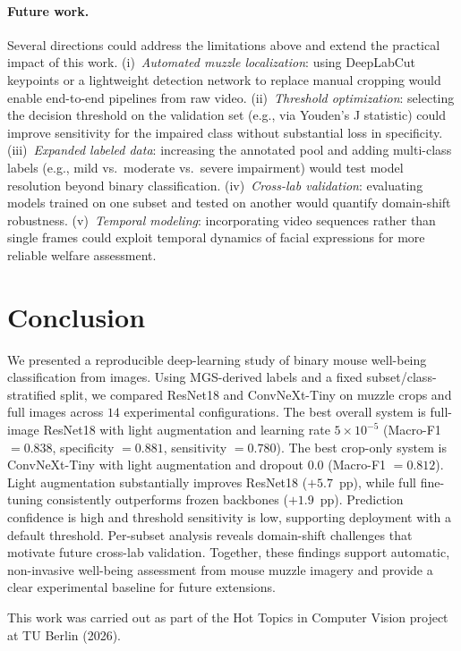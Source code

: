 \documentclass[sigconf]{acmart}
\begin{document}
\paragraph{Future work.}
Several directions could address the limitations above and extend the
practical impact of this work. (i)~\emph{Automated muzzle localization}: using
DeepLabCut keypoints or a lightweight detection network to replace manual
cropping would enable end-to-end pipelines from raw video. (ii)~\emph{Threshold
optimization}: selecting the decision threshold on the validation set (e.g.,
via Youden's J statistic) could improve sensitivity for the impaired class
without substantial loss in specificity. (iii)~\emph{Expanded labeled data}:
increasing the annotated pool and adding multi-class labels (e.g., mild vs.\
moderate vs.\ severe impairment) would test model resolution beyond binary
classification. (iv)~\emph{Cross-lab validation}: evaluating models trained on
one subset and tested on another would quantify domain-shift robustness.
(v)~\emph{Temporal modeling}: incorporating video sequences rather than single
frames could exploit temporal dynamics of facial expressions for more reliable
welfare assessment.

\section{Conclusion}
\label{sec:conclusion}

We presented a reproducible deep-learning study of binary mouse well-being
classification from images. Using MGS-derived labels and a fixed
subset/class-stratified split, we compared ResNet18 and ConvNeXt-Tiny on muzzle
crops and full images across $14$ experimental configurations. The best overall
system is full-image ResNet18 with light augmentation and learning rate
$5\times10^{-5}$ (Macro-F1 $=0.838$, specificity $=0.881$, sensitivity
$=0.780$). The best crop-only system is ConvNeXt-Tiny with light augmentation
and dropout $0.0$ (Macro-F1 $=0.812$). Light augmentation substantially
improves ResNet18 ($+5.7$~pp), while full fine-tuning consistently outperforms
frozen backbones ($+1.9$~pp). Prediction confidence is high and threshold
sensitivity is low, supporting deployment with a default threshold. Per-subset
analysis reveals domain-shift challenges that motivate future cross-lab
validation. Together, these findings support automatic, non-invasive well-being
assessment from mouse muzzle imagery and provide a clear experimental baseline
for future extensions.

\begin{acks}
This work was carried out as part of the Hot Topics in Computer Vision project
at TU Berlin (2026).
\end{acks}



\end{document}
